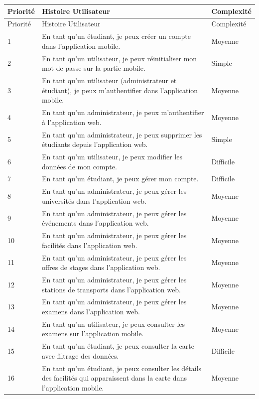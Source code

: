 \begin{sloppypar}
\vspace{-2cm}
\begin{longtable}{|p{1.5cm}|p{11cm}|p{2cm}|}
\hline
\textbf{Priorité} & \textbf{Histoire Utilisateur} & \textbf{Complexité} \\
\hline
\endfirsthead
\hline
Priorité & Histoire Utilisateur & Complexité \\
\hline
\endhead
1 & En tant qu’un étudiant, je peux créer un compte dans l’application mobile. & Moyenne \\
\hline
2 & En tant qu’un utilisateur, je peux réinitialiser mon mot de passe sur la partie mobile. & Simple \\
\hline
3 & En tant qu’un utilisateur (administrateur et étudiant), je peux m’authentifier dans l’application mobile. & Moyenne \\
\hline
4 & En tant qu’un administrateur, je peux m’authentifier à l’application web. & Moyenne \\
\hline
5 & En tant qu’un administrateur, je peux supprimer les étudiants depuis l’application web. & Simple \\
\hline
6 & En tant qu’un utilisateur, je peux modifier les données de mon compte. & Difficile \\
\hline
7 & En tant qu’un étudiant, je peux gérer mon compte. & Difficile \\
\hline
8 & En tant qu’un administrateur, je peux gérer les universités dans l’application web. & Moyenne \\
\hline
9 & En tant qu’un administrateur, je peux gérer les événements dans l’application web. & Moyenne \\
\hline
10 & En tant qu’un administrateur, je peux gérer les facilités dans l’application web. & Moyenne \\
\hline
11 & En tant qu’un administrateur, je peux gérer les offres de stages dans l’application web. & Moyenne \\
\hline
12 & En tant qu’un administrateur, je peux gérer les stations de transports dans l’application web. & Moyenne \\
\hline
13 & En tant qu’un administrateur, je peux gérer les examens dans l’application web. & Moyenne \\
\hline
14 & En tant qu’un utilisateur, je peux consulter les examens sur l'application mobile. & Moyenne \\
\hline
15 & En tant qu’un étudiant, je peux consulter la carte avec filtrage des données. & Difficile \\
\hline
16 & En tant qu’un étudiant, je peux consulter les détails des facilités qui apparaissent dans la carte dans l’application mobile. & Moyenne \\

\end{longtable}
\end{sloppypar}
